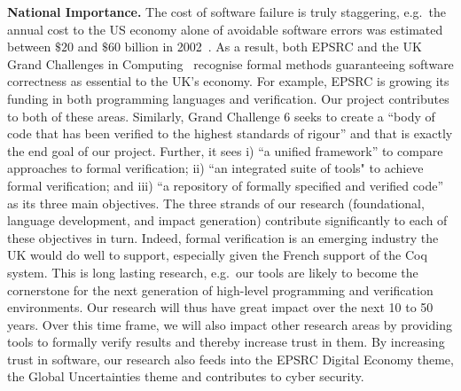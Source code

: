 \documentclass[a4paper,11pt]{article}
\newcommand{\eg}{{e.g.}\ }
\begin{document}

{\bf National Importance.}  The cost of software failure is truly
staggering, \eg the annual cost to the US economy alone of avoidable
software errors was estimated between $\$ 20$ and $\$60$
billion in 2002~\cite{grandchallenges}.  As a result, both EPSRC and
the UK Grand Challenges in Computing~\cite{grandchallenges} recognise
formal methods guaranteeing software correctness as essential to the
UK's economy. For example, EPSRC is growing its funding in both
programming languages and verification. Our project contributes to
both of these areas. Similarly, Grand Challenge 6 seeks to create a
``body of code that has been verified to the highest standards of
rigour'' and that is exactly the end goal of our project. Further, it
sees i) ``a unified framework'' to compare approaches to formal
verification; ii) ``an integrated suite of tools" to achieve formal
verification; and iii) ``a repository of formally specified and
verified code'' as its three main objectives. The three strands of our
research (foundational, language development, and impact generation)
contribute significantly to each of these objectives in turn.  Indeed,
formal verification is an emerging industry the UK would do well to
support, especially given the French support of the Coq system. This
is long lasting research, \eg our tools are likely to become the
cornerstone for the next generation of high-level programming and
verification environments. Our research will thus have great impact
over the next 10 to 50 years.  Over this time frame, we will also
impact other research areas by providing tools to formally verify
results and thereby increase trust in them. By increasing trust in
software, our research also feeds into the EPSRC Digital Economy
theme, the Global Uncertainties theme and contributes to cyber
security.
\end{document}
